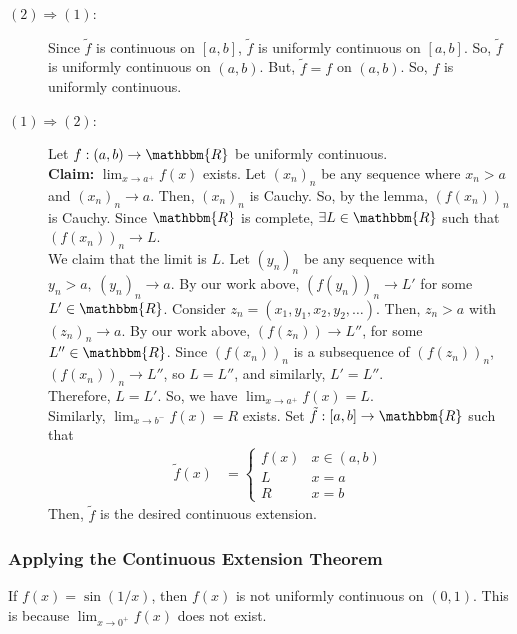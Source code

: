 \documentclass[10pt]{extarticle}
\newcommand{\R}{\mathbbm{R}}
\begin{document}
    \begin{description}
      \item[$(2) \Rightarrow (1)$:] Since $\tilde{f}$ is continuous on $[a,b]$, $\tilde{f}$ is uniformly continuous on $[a,b]$. So, $\tilde{f}$ is uniformly continuous on $(a,b)$. But, $\tilde{f} = f$ on $(a,b)$. So, $f$ is uniformly continuous.
      \item[$(1) \Rightarrow (2)$:] Let $f: (a,b) \rightarrow \R$ be uniformly continuous.\\

        \textbf{Claim:} $\lim_{x\rightarrow a^{+}}f(x)$ exists. Let $(x_n)_n$ be any sequence where $x_n > a$ and $(x_n)_n \rightarrow a$. Then, $(x_n)_n$ is Cauchy. So, by the lemma, $(f(x_n))_n$ is Cauchy. Since $\R$ is complete, $\exists L\in \R$ such that $\left(f(x_n)\right)_n \rightarrow L$.\\

        We claim that the limit is $L$. Let $(y_n)_n$ be any sequence with $y_n > a,~(y_n)_n\rightarrow a$. By our work above, $\left(f(y_n)\right)_n \rightarrow L'$ for some $L'\in \R$. Consider $z_n = (x_1,y_1,x_2,y_2,\dots)$. Then, $z_n > a$ with $(z_n)_n \rightarrow a$. By our work above, $\left(f(z_n)\right) \rightarrow L''$, for some $L''\in \R$. Since $(f(x_n))_n$ is a subsequence of $(f(z_n))_n$, $\left(f(x_n)\right)_n \rightarrow L''$, so $L = L''$, and similarly, $L' = L''$.\\

        Therefore, $L = L'$. So, we have $\lim_{x\rightarrow a^+} f(x) = L$.\\

        Similarly, $\lim_{x\rightarrow b^-}f(x) = R$ exists. Set $\tilde{f}: [a,b] \rightarrow \R$ such that
        \begin{align*}
          \tilde{f}(x) &= \begin{cases}
            f(x) & x\in (a,b)\\
            L & x=a\\
            R & x=b
          \end{cases}
        \end{align*}
        Then, $\tilde{f}$ is the desired continuous extension.
    \end{description}
    \subsubsection{Applying the Continuous Extension Theorem}%
    If $f(x) = \sin(1/x)$, then $f(x)$ is not uniformly continuous on $(0,1)$. This is because $\lim_{x\rightarrow 0^+}f(x)$ does not exist.\\
\end{document}

